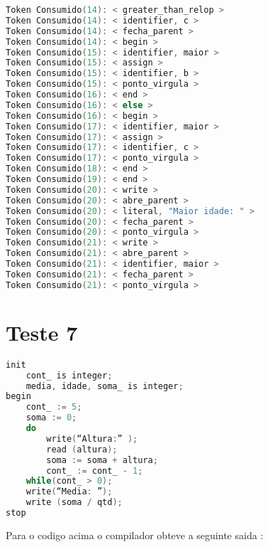 \begin{lstlisting}[caption={Saida Correta para o Codigo de teste  : Teste6.txt},label={Entrada 1},language=C]
Token Consumido(14): < greater_than_relop >
Token Consumido(14): < identifier, c >
Token Consumido(14): < fecha_parent >
Token Consumido(14): < begin >
Token Consumido(15): < identifier, maior >
Token Consumido(15): < assign >
Token Consumido(15): < identifier, b >
Token Consumido(15): < ponto_virgula >
Token Consumido(16): < end >
Token Consumido(16): < else >
Token Consumido(16): < begin >
Token Consumido(17): < identifier, maior >
Token Consumido(17): < assign >
Token Consumido(17): < identifier, c >
Token Consumido(17): < ponto_virgula >
Token Consumido(18): < end >
Token Consumido(19): < end >
Token Consumido(20): < write >
Token Consumido(20): < abre_parent >
Token Consumido(20): < literal, "Maior idade: " >
Token Consumido(20): < fecha_parent >
Token Consumido(20): < ponto_virgula >
Token Consumido(21): < write >
Token Consumido(21): < abre_parent >
Token Consumido(21): < identifier, maior >
Token Consumido(21): < fecha_parent >
Token Consumido(21): < ponto_virgula >


\end{lstlisting}\newline




\section{Teste 7}



\begin{lstlisting}[caption={Teste7.txt},label={lst:label},language=C]
% Programa de Teste Calculo de idade %
init
	cont_ is integer;
	media, idade, soma_ is integer;
begin
	cont_ := 5;
	soma := 0;
	do
		write(“Altura:” );
		read (altura);
		soma := soma + altura;
		cont_ := cont_ - 1;
	while(cont_ > 0);
	write(“Media: ”);
	write (soma / qtd);
stop
\end{lstlisting}

Para o codigo acima o compilador obteve a seguinte saida :

